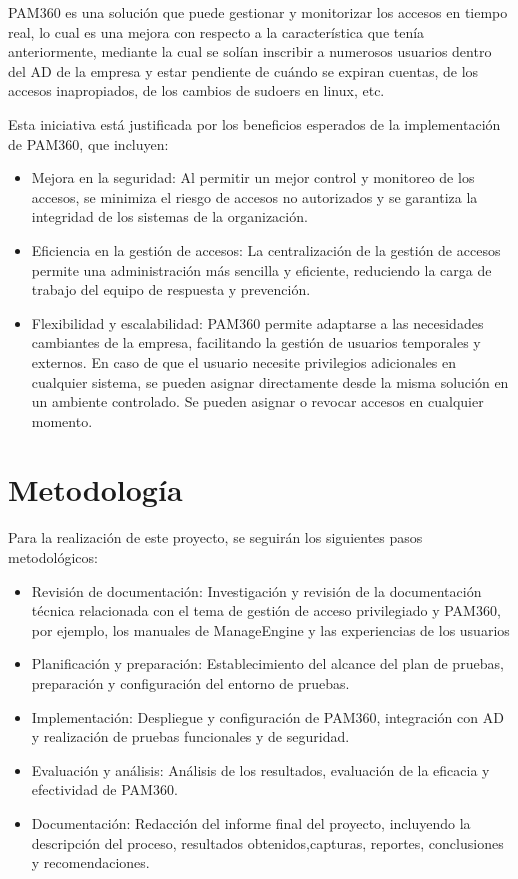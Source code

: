 PAM360 es una solución que puede gestionar y monitorizar los accesos en tiempo real, lo cual es una mejora con respecto a la característica que tenía anteriormente, mediante la cual se solían inscribir a numerosos usuarios dentro del AD de la empresa y estar pendiente de cuándo se expiran cuentas, de los accesos inapropiados, de los cambios de sudoers en linux, etc.

Esta iniciativa está justificada por los beneficios esperados de la implementación de PAM360, que incluyen:
\begin{itemize}
\item Mejora en la seguridad: Al permitir un mejor control y monitoreo de los accesos, se minimiza el riesgo de accesos no autorizados y se garantiza la integridad de los sistemas de la organización.

\item Eficiencia en la gestión de accesos: La centralización de la gestión de accesos permite una administración más sencilla y eficiente, reduciendo la carga de trabajo del equipo de respuesta y prevención.

\item Flexibilidad y escalabilidad: PAM360 permite adaptarse a las necesidades cambiantes de la empresa, facilitando la gestión de usuarios temporales y externos. En caso de que el usuario necesite privilegios adicionales en cualquier sistema, se pueden asignar directamente desde la misma solución en un ambiente controlado. Se pueden asignar o revocar accesos en cualquier momento.

\end{itemize}

\section{Metodología}

Para la realización de este proyecto, se seguirán los siguientes pasos metodológicos:

\begin{itemize}
\item Revisión de documentación: Investigación y revisión de la documentación técnica relacionada con el tema de gestión de acceso privilegiado y PAM360, por ejemplo, los manuales de ManageEngine y las experiencias de los usuarios

\item Planificación y preparación: Establecimiento del alcance del plan de pruebas, preparación y configuración del entorno de pruebas.

\item Implementación: Despliegue y configuración de PAM360, integración con AD y realización de pruebas funcionales y de seguridad.

\item Evaluación y análisis: Análisis de los resultados, evaluación de la eficacia y efectividad de PAM360.

\item Documentación: Redacción del informe final del proyecto, incluyendo la descripción del proceso, resultados obtenidos,capturas, reportes, conclusiones y recomendaciones.

\end{itemize}

